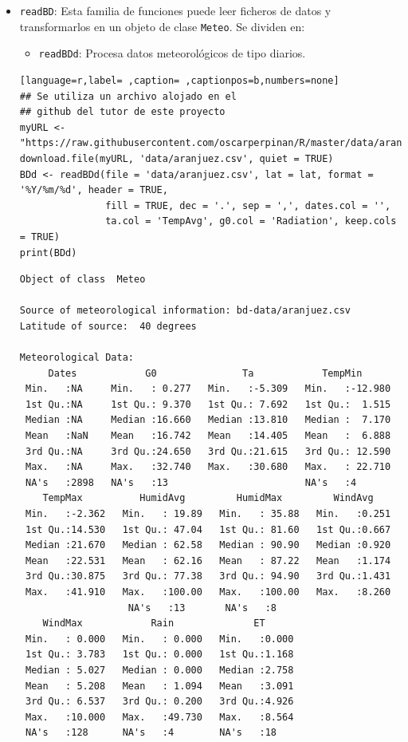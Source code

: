 \begin{itemize}
\item \texttt{readBD}: Esta familia de funciones puede leer ficheros de datos y transformarlos en un objeto de clase \texttt{Meteo}. Se dividen en:
\begin{itemize}
\item \texttt{readBDd}: Procesa datos meteorológicos de tipo diarios.
\end{itemize}
\begin{lstlisting}[language=r,label= ,caption= ,captionpos=b,numbers=none]
## Se utiliza un archivo alojado en el
## github del tutor de este proyecto 
myURL <-"https://raw.githubusercontent.com/oscarperpinan/R/master/data/aranjuez.csv"
download.file(myURL, 'data/aranjuez.csv', quiet = TRUE)
BDd <- readBDd(file = 'data/aranjuez.csv', lat = lat, format = '%Y/%m/%d', header = TRUE,
               fill = TRUE, dec = '.', sep = ',', dates.col = '',
               ta.col = 'TempAvg', g0.col = 'Radiation', keep.cols = TRUE)
print(BDd)
\end{lstlisting}

\begin{verbatim}
Object of class  Meteo 

Source of meteorological information: bd-data/aranjuez.csv 
Latitude of source:  40 degrees

Meteorological Data:
     Dates            G0               Ta            TempMin       
 Min.   :NA     Min.   : 0.277   Min.   :-5.309   Min.   :-12.980  
 1st Qu.:NA     1st Qu.: 9.370   1st Qu.: 7.692   1st Qu.:  1.515  
 Median :NA     Median :16.660   Median :13.810   Median :  7.170  
 Mean   :NaN    Mean   :16.742   Mean   :14.405   Mean   :  6.888  
 3rd Qu.:NA     3rd Qu.:24.650   3rd Qu.:21.615   3rd Qu.: 12.590  
 Max.   :NA     Max.   :32.740   Max.   :30.680   Max.   : 22.710  
 NA's   :2898   NA's   :13                        NA's   :4        
    TempMax          HumidAvg         HumidMax         WindAvg     
 Min.   :-2.362   Min.   : 19.89   Min.   : 35.88   Min.   :0.251  
 1st Qu.:14.530   1st Qu.: 47.04   1st Qu.: 81.60   1st Qu.:0.667  
 Median :21.670   Median : 62.58   Median : 90.90   Median :0.920  
 Mean   :22.531   Mean   : 62.16   Mean   : 87.22   Mean   :1.174  
 3rd Qu.:30.875   3rd Qu.: 77.38   3rd Qu.: 94.90   3rd Qu.:1.431  
 Max.   :41.910   Max.   :100.00   Max.   :100.00   Max.   :8.260  
				   NA's   :13       NA's   :8      
    WindMax            Rain              ET       
 Min.   : 0.000   Min.   : 0.000   Min.   :0.000  
 1st Qu.: 3.783   1st Qu.: 0.000   1st Qu.:1.168  
 Median : 5.027   Median : 0.000   Median :2.758  
 Mean   : 5.208   Mean   : 1.094   Mean   :3.091  
 3rd Qu.: 6.537   3rd Qu.: 0.200   3rd Qu.:4.926  
 Max.   :10.000   Max.   :49.730   Max.   :8.564  
 NA's   :128      NA's   :4        NA's   :18
\end{verbatim}


\end{itemize}
